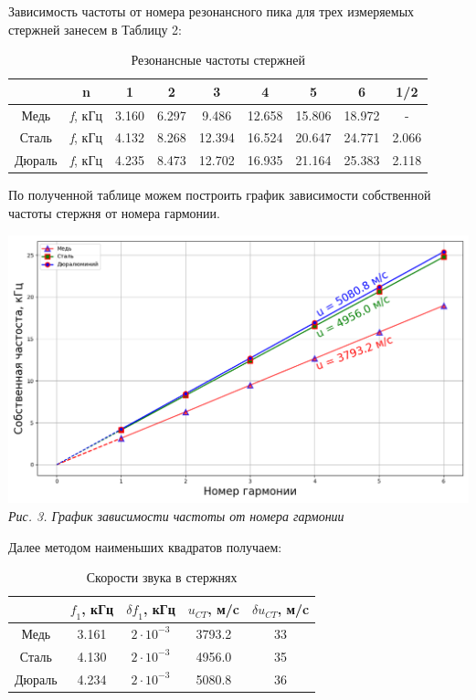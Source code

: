 \documentclass[12pt, a4paper]{article}
\begin{document}
Зависимость частоты от номера резонансного пика для трех измеряемых стержней занесем в Таблицу 2:
\begin{table}[h!]
\begin{center}
\caption{Резонансные частоты стержней}
\begin{tabular}{|c|c|c|c|c|c|c|c|c|}
\hline
 &n &1 &2 &3 &4 &5 &6 &1/2 \\
\hline
 Медь& \textit{f}, кГц& 3.160& 6.297& 9.486& 12.658& 15.806& 18.972& - \\
\hline
 Сталь& \textit{f}, кГц& 4.132& 8.268& 12.394& 16.524& 20.647& 24.771& 2.066 \\
\hline
 Дюраль& \textit{f}, кГц& 4.235& 8.473& 12.702& 16.935& 21.164& 25.383& 2.118 \\
\hline
\end{tabular}
\end{center}
\end{table}

По полученной таблице можем построить график зависимости собственной частоты стержня
от номера гармонии.

\begin{center}
    \includegraphics[scale=0.4]{Pics/Picture3.png} \\
    \textit{\textcolor[HTML]{000000}{Рис. 3. График зависимости частоты от номера гармонии}}
\end{center}

Далее методом наименьших квадратов получаем:
\begin{table}[h!]
\begin{center}
\caption{Скорости звука в стержнях}
\begin{tabular}{|c|c|c|c|c|}
\hline
 & $\textit{f}_1$, кГц& $\delta\textit{f}_1$, кГц& $u_{CT}$, м/c& $\delta u_{CT}$, м/c\\ 
\hline
 Медь& 3.161& $2 \cdot 10^{-3}$& 3793.2& 33\\
\hline 
 Сталь& 4.130& $2 \cdot 10^{-3}$& 4956.0& 35\\
\hline 
 Дюраль& 4.234& $2 \cdot 10^{-3}$& 5080.8& 36\\
\hline 
\end{tabular}
\end{center}
\end{table}
\end{document}
